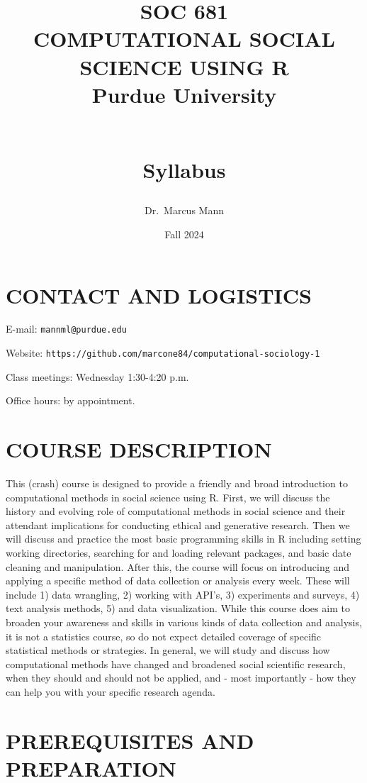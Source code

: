 \documentclass[
  10pt,
]{article}
\title{SOC 681\\
COMPUTATIONAL SOCIAL SCIENCE USING R\\
Purdue University\\
\strut \\
\hspace*{0.333em}Syllabus}
\author{Dr.~Marcus Mann}
\date{Fall 2024}
\begin{document}
\maketitle

\hypertarget{contact-and-logistics}{%
\section{CONTACT AND LOGISTICS}\label{contact-and-logistics}}

E-mail: \texttt{mannml@purdue.edu}

Website: \texttt{https://github.com/marcone84/computational-sociology-1}

Class meetings: Wednesday 1:30-4:20 p.m.

Office hours: by appointment.

\hypertarget{course-description}{%
\section{COURSE DESCRIPTION}\label{course-description}}

This (crash) course is designed to provide a friendly and broad
introduction to computational methods in social science using R. First,
we will discuss the history and evolving role of computational methods
in social science and their attendant implications for conducting
ethical and generative research. Then we will discuss and practice the
most basic programming skills in R including setting working
directories, searching for and loading relevant packages, and basic date
cleaning and manipulation. After this, the course will focus on
introducing and applying a specific method of data collection or
analysis every week. These will include 1) data wrangling, 2) working
with API's, 3) experiments and surveys, 4) text analysis methods, 5) and
data visualization. While this course does aim to broaden your awareness
and skills in various kinds of data collection and analysis, it is not a
statistics course, so do not expect detailed coverage of specific
statistical methods or strategies. In general, we will study and discuss
how computational methods have changed and broadened social scientific
research, when they should and should not be applied, and - most
importantly - how they can help you with your specific research agenda.

\hypertarget{prerequisites-and-preparation}{%
\section{PREREQUISITES AND
PREPARATION}\label{prerequisites-and-preparation}}
\end{document}
